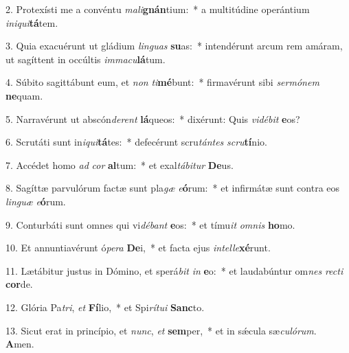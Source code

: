 2. Protexísti me a convéntu \textit{ma}\textit{li}\textbf{gnán}tium:~*  a multitúdine operántium \textit{in}\textit{i}\textit{qui}\textbf{tá}tem.\

3. Quia exacuérunt ut gládium \textit{lin}\textit{guas} \textbf{su}as:~*  intendérunt arcum rem amáram, ut sagíttent in occúltis \textit{im}\textit{ma}\textit{cu}\textbf{lá}tum.\

4. Súbito sagittábunt eum, et \textit{non} \textit{ti}\textbf{mé}bunt:~*  firmavérunt sibi \textit{ser}\textit{mó}\textit{nem} \textbf{ne}quam.\

5. Narravérunt ut abscón\textit{de}\textit{rent} \textbf{lá}queos:~*  dixérunt: Quis \textit{vi}\textit{dé}\textit{bit} \textbf{e}os?\

6. Scrutáti sunt in\textit{i}\textit{qui}\textbf{tá}tes:~*  defecérunt scru\textit{tán}\textit{tes} \textit{scru}\textbf{tí}nio.\

7. Accédet homo \textit{ad} \textit{cor} \textbf{al}tum:~*  et exal\textit{tá}\textit{bi}\textit{tur} \textbf{De}us.\

8. Sagíttæ parvulórum factæ sunt pla\textit{gæ} \textit{e}\textbf{ó}rum:~*  et infirmátæ sunt contra eos \textit{lin}\textit{guæ} \textit{e}\textbf{ó}rum.\

9. Conturbáti sunt omnes qui vi\textit{dé}\textit{bant} \textbf{e}os:~*  et tímu\textit{it} \textit{om}\textit{nis} \textbf{ho}mo.\

10. Et annuntiavérunt ó\textit{pe}\textit{ra} \textbf{De}i,~*  et facta ejus \textit{in}\textit{tel}\textit{le}\textbf{xé}runt.\

11. Lætábitur justus in Dómino, et sperá\textit{bit} \textit{in} \textbf{e}o:~*  et laudabúntur om\textit{nes} \textit{rec}\textit{ti} \textbf{cor}de.\

12. Glória Pa\textit{tri}, \textit{et} \textbf{Fí}lio,~*  et Spi\textit{rí}\textit{tu}\textit{i} \textbf{Sanc}to.\

13. Sicut erat in princípio, et \textit{nunc}, \textit{et} \textbf{sem}per,~*  et in sǽcula sæ\textit{cu}\textit{ló}\textit{rum}. \textbf{A}men.\

